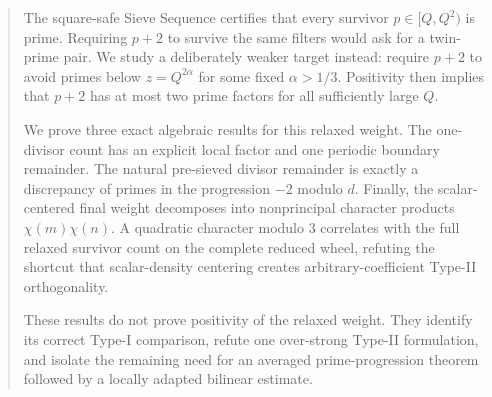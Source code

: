 \begin{abstract}
The square-safe Sieve Sequence certifies that every survivor
$p\in[Q,Q^2)$ is prime. Requiring $p+2$ to survive the same filters would ask
for a twin-prime pair. We study a deliberately weaker target instead:
require $p+2$ to avoid primes below $z=Q^{2\alpha}$ for some fixed
$\alpha>1/3$. Positivity then implies that $p+2$ has at most two prime
factors for all sufficiently large $Q$.

We prove three exact algebraic results for this relaxed weight. The
one-divisor count has an explicit local factor and one periodic boundary
remainder. The natural pre-sieved divisor remainder is exactly a discrepancy
of primes in the progression $-2$ modulo $d$. Finally, the scalar-centered
final weight decomposes into nonprincipal character products
$\chi(m)\chi(n)$. A quadratic character modulo $3$ correlates with the full
relaxed survivor count on the complete reduced wheel, refuting the shortcut
that scalar-density centering creates arbitrary-coefficient Type-II
orthogonality.

These results do not prove positivity of the relaxed weight. They identify its
correct Type-I comparison, refute one over-strong Type-II formulation, and
isolate the remaining need for an averaged prime-progression theorem followed
by a locally adapted bilinear estimate.
\end{abstract}
